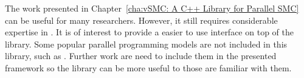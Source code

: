 The work presented in Chapter~\ref{cha:vSMC: A C++ Library for Parallel SMC}
can be useful for many researchers. However, it still requires considerable
expertise in \cpp. It is of interest to provide a easier to use interface on
top of the library. Some popular parallel programming models are not included
in this library, such as \cuda \cite{cuda}. Further work are need to include
them in the presented framework so the library can be more useful to those are
familiar with them.
